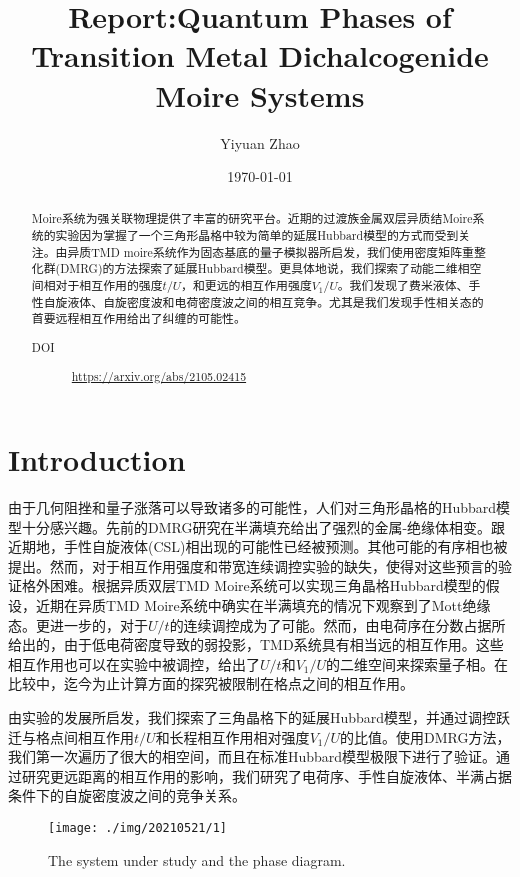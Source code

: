 \documentclass[reprint, aps, prb, showkeys]{revtex4-2}
\begin{document}
\title{Report:Quantum Phases of Transition Metal Dichalcogenide Moire Systems}

\author{Yiyuan Zhao}
\date{\today}

\begin{abstract}
Moire系统为强关联物理提供了丰富的研究平台。近期的过渡族金属双层异质结Moire系统的实验因为掌握了一个三角形晶格中较为简单的延展Hubbard模型的方式而受到关注。由异质TMD moire系统作为固态基底的量子模拟器所启发，我们使用密度矩阵重整化群(DMRG)的方法探索了延展Hubbard模型。更具体地说，我们探索了动能二维相空间相对于相互作用的强度$t/U$，和更远的相互作用强度$V_1/U$。我们发现了费米液体、手性自旋液体、自旋密度波和电荷密度波之间的相互竞争。尤其是我们发现手性相关态的首要远程相互作用给出了纠缠的可能性。
\begin{description}
    \item[DOI] \url{https://arxiv.org/abs/2105.02415}
\end{description}
\end{abstract}


\maketitle

\section{Introduction}
由于几何阻挫和量子涨落可以导致诸多的可能性，人们对三角形晶格的Hubbard模型十分感兴趣。先前的DMRG研究在半满填充给出了强烈的金属-绝缘体相变。跟近期地，手性自旋液体(CSL)相出现的可能性已经被预测。其他可能的有序相也被提出。然而，对于相互作用强度和带宽连续调控实验的缺失，使得对这些预言的验证格外困难。根据异质双层TMD Moire系统可以实现三角晶格Hubbard模型的假设，近期在异质TMD Moire系统中确实在半满填充的情况下观察到了Mott绝缘态。更进一步的，对于$U/t$的连续调控成为了可能。然而，由电荷序在分数占据所给出的，由于低电荷密度导致的弱投影，TMD系统具有相当远的相互作用。这些相互作用也可以在实验中被调控，给出了$U/t$和$V_1/U$的二维空间来探索量子相。在比较中，迄今为止计算方面的探究被限制在格点之间的相互作用。

由实验的发展所启发，我们探索了三角晶格下的延展Hubbard模型，并通过调控跃迁与格点间相互作用$t/U$和长程相互作用相对强度$V_1/U$的比值。使用DMRG方法，我们第一次遍历了很大的相空间，而且在标准Hubbard模型极限下进行了验证。通过研究更远距离的相互作用的影响，我们研究了电荷序、手性自旋液体、半满占据条件下的自旋密度波之间的竞争关系。
\begin{figure}[t]
    \texttt{[image: ./img/20210521/1]}
    \caption{\label{fig:phaseDiagram} 
    The system under study and the phase diagram.
    }
\end{figure}
\end{document}
